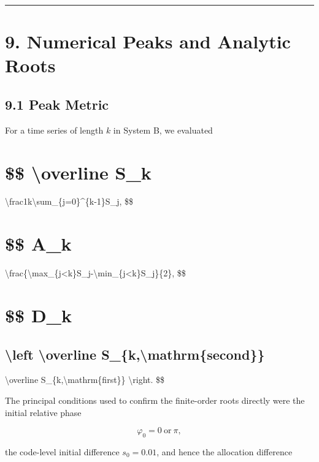 \documentclass[
  a4paper,
  10pt]{article}
\begin{document}
\begin{center}\rule{0.5\linewidth}{0.5pt}\end{center}

\section{9. Numerical Peaks and Analytic
Roots}\label{9-numerical-peaks-and-analytic-roots}

\subsection{9.1 Peak Metric}\label{91-peak-metric}

For a time series of length \(k\) in System B, we evaluated

\section{\$\$ \textbackslash overline S\_k}\label{-overline-s_k}

\textbackslash frac1k\textbackslash sum\_\{j=0\}\^{}\{k-1\}S\_j, \$\$

\section{\$\$ A\_k}\label{-a_k}

\textbackslash frac\{\textbackslash max\_\{j\textless k\}S\_j-\textbackslash min\_\{j\textless k\}S\_j\}\{2\},
\$\$

\section{\$\$ D\_k}\label{-d_k}

\subsection{\textbackslash left\textbar{} \textbackslash overline
S\_\{k,\textbackslash mathrm\{second\}\}}\label{left-overline-s_kmathrmsecond}

\textbackslash overline S\_\{k,\textbackslash mathrm\{first\}\}
\textbackslash right\textbar. \$\$

The principal conditions used to confirm the finite-order roots directly
were the initial relative phase

\[
\varphi_0=0\ \text{or}\ \pi,
\]

the code-level initial difference \(s_0=0.01\), and hence the allocation
difference
\end{document}

